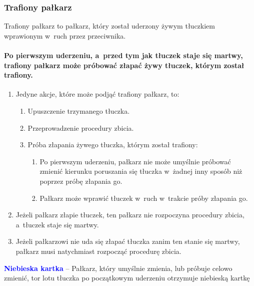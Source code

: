 \documentclass[12pt,a4paper]{article}
\newcommand\bluecard[1]{\bgroup\textcolor{blue}{\textbf{#1}}}
\begin{document}
\subsubsection{Trafiony pałkarz}

Trafiony pałkarz to pałkarz, który został uderzony żywym tłuczkiem
wprawionym w~ruch przez przeciwnika.

\paragraph{Po pierwszym uderzeniu, a~przed tym jak tłuczek staje
	się martwy, trafiony pałkarz może próbować złapać żywy tłuczek, którym
	został trafiony.}

\begin{enumerate}
	\item
	      Jedyne akcje, które może podjąć trafiony pałkarz, to:

	      \begin{enumerate}
		      \item
		            Upuszczenie trzymanego tłuczka.
		      \item
		            Przeprowadzenie procedury zbicia.
		      \item
		            Próba złapania żywego tłuczka, którym został trafiony:

		            \begin{enumerate}
			            \item
			                  Po pierwszym uderzeniu, pałkarz nie może umyślnie próbować zmienić
			                  kierunku poruszania się tłuczka w~żadnej inny sposób niż poprzez
			                  próbę złapania go.
			            \item
			                  Pałkarz może wprawić tłuczek w~ruch w~trakcie próby złapania go.
		            \end{enumerate}
	      \end{enumerate}
	\item
	      Jeżeli pałkarz złapie tłuczek, ten pałkarz nie rozpoczyna procedury zbicia, a~tłuczek staje się martwy.
	\item
	      Jeżeli pałkarzowi nie uda się złapać tłuczka zanim ten stanie się
	      martwy, pałkarz musi natychmiast rozpocząć procedurę zbicia.
\end{enumerate}

\bluecard{Niebieska kartka} -- Pałkarz, który umyślnie zmienia, lub próbuje
celowo zmienić, tor lotu tłuczka po początkowym uderzeniu otrzymuje
niebieską kartkę
\end{document}
